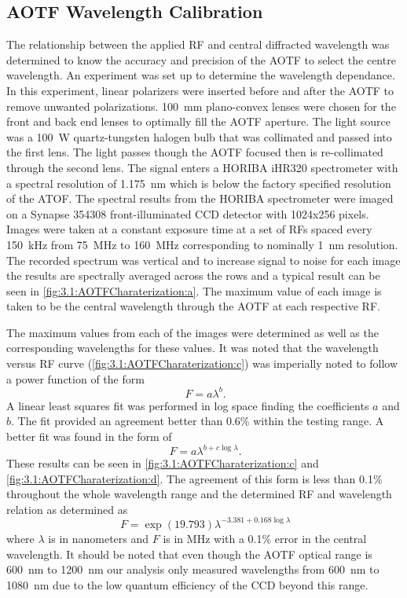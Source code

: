 \documentclass[12pt]{article}
\begin{document}
\subsection{AOTF Wavelength Calibration}

The relationship between the applied RF and central diffracted wavelength was determined to know the accuracy and precision of the AOTF to select the centre wavelength. An experiment was set up to determine the wavelength dependance. In this experiment, linear polarizers were inserted before and after the AOTF to remove unwanted polarizations. 100~mm plano-convex lenses were chosen for the front and back end lenses to optimally fill the AOTF aperture. The light source was a 100~W quartz-tungsten halogen bulb that was collimated and passed into the first lens. The light passes though the AOTF focused then is re-collimated through the second lens. The signal enters a HORIBA iHR320 spectrometer with a spectral resolution of 1.175~nm which is below the factory specified resolution of the ATOF. The spectral results from the HORIBA spectrometer were imaged on a Synapse 354308 front-illuminated CCD detector with 1024x256 pixels. Images were taken at a constant exposure time at a set of RFs spaced every 150~kHz from 75~MHz to 160~MHz corresponding to nominally 1~nm resolution. The recorded spectrum was vertical and to increase signal to noise for each image the results are spectrally averaged across the rows and a typical result can be seen in \autoref{fig:3.1:AOTFCharaterization:a}. The maximum value of each image is taken to be the central wavelength through the AOTF at each respective RF.

The maximum values from each of the images were determined as well as the corresponding wavelengths for these values. It was noted that the wavelength versus RF curve (\autoref{fig:3.1:AOTFCharaterization:c}) was imperially noted to follow a power function of the form
\begin{equation}
    \ F = a\lambda^{b}.
    \label{eqn:3.1:powerFunction}
\end{equation}
A linear least squares fit was performed in log space finding the coefficients $a$ and $b$. The fit provided an agreement better than 0.6\% within the testing range. A better fit was found in the form of
 \begin{equation}
    \ F = a\lambda^{b+c\log\lambda}.
    \label{eqn:3.1:modifiedPowerFunction}
\end{equation}
These results can be seen in \autoref{fig:3.1:AOTFCharaterization:c} and \autoref{fig:3.1:AOTFCharaterization:d}. The agreement of this form is less than 0.1\% throughout the whole wavelength range and the determined RF and wavelength relation as determined as
\begin{equation}
    \ F = \exp{(19.793)}\lambda^{-3.381+0.168\log\lambda}
    \label{eqn:3.1:modifiedPowerFunctionCoeffiecicents}
\end{equation}
where $\lambda$ is in nanometers and $F$ is in MHz with a 0.1\% error in the central wavelength. It should be noted that even though the AOTF optical range is 600~nm to 1200~nm our analysis only measured wavelengths from 600~nm to 1080~nm due to the low quantum efficiency of the CCD beyond this range.
\end{document}
